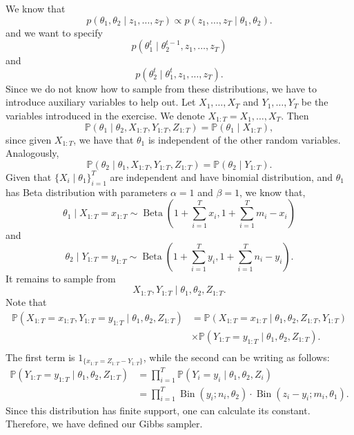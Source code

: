 \documentclass[a4paper,12pt]{article}
\newcommand{\bin}{\operatorname{Bin}}
\newcommand{\pr}{\mathbb{P}}
\theoremstyle{definition}
\begin{document}
\begin{enumerate}
    We know that 
    $$
    p( \theta_1 , \theta_2 \mid z_1 , \dots, z_T) \propto p(z_1, \dots, z_T \mid \theta_1, \theta_2).    
    $$
    and we want to specify 
    $$
    p(\theta_1^t \mid \theta_2^{t-1}, z_1, \dots, z_T) 
    $$
    and
    $$
    p(\theta_2^t \mid \theta_1^{t}, z_1, \dots, z_T).
    $$ 
    Since we do not know how to sample from these distributions, we have to
    introduce auxiliary variables to help out. Let $X_1, \dots, X_T$ and $Y_1,
    \dots, Y_T$ be the variables introduced in the exercise. We denote
    $X_{1:T} = X_1, \dots, X_T$. Then 
    $$ 
    \pr(\theta_1 \mid \theta_2, X_{1:T}, Y_{1:T}, Z_{1:T}) = \pr(\theta_1 \mid X_{1:T}),  
    $$
    since given $X_{1:T}$, we have that $\theta_1$ is independent of the other
    random variables. Analogously,  
    $$ 
    \pr(\theta_2 \mid \theta_1, X_{1:T}, Y_{1:T}, Z_{1:T}) = \pr(\theta_2 \mid Y_{1:T}).  
    $$
    Given that $\{X_i \mid \theta_1\}_{i=1}^T$ are independent and have
    binomial distribution, and $\theta_1$ has Beta distribution with
    parameters $\alpha = 1$ and $\beta = 1$, we know that, 
    $$
    \theta_1 \mid X_{1:T} = x_{1:T} \sim \operatorname{Beta}\left(1 + \sum_{i=1}^T x_i, 1 + \sum_{i=1}^T m_i - x_i\right)
    $$
    and 
    $$
    \theta_2 \mid Y_{1:T} = y_{1:T} \sim \operatorname{Beta}\left(1 + \sum_{i=1}^T y_i, 1 + \sum_{i=1}^T n_i - y_i\right).
    $$
    It remains to sample from 
    $$
    X_{1:T}, Y_{1:T} \mid \theta_1, \theta_2, Z_{1:T}.
    $$
    Note that 
    \begin{equation*}
        \begin{split}
            \pr(X_{1:T} = x_{1:T}, Y_{1:T} = y_{1:T} \mid \theta_1, \theta_2, Z_{1:T}) &= \pr(X_{1:T} = x_{1:T} \mid \theta_1, \theta_2, Z_{1:T},  Y_{1:T}) \\
            &\times \pr(Y_{1:T} = y_{1:T} \mid \theta_1, \theta_2, Z_{1:T}). \\
        \end{split}
    \end{equation*}
    The first term is $1_{\{x_{1:T} = Z_{1:T} - Y_{1:T}\}}$, while the second
    can be writing as follows: 
    \begin{equation*}
        \begin{split}
            \pr(Y_{1:T} = y_{1:T} \mid \theta_1, \theta_2, Z_{1:T}) &= \prod_{i=1}^T \pr(Y_i = y_i \mid \theta_1, \theta_2, Z_i) \\
            &= \prod_{i=1}^T \bin(y_i; n_i, \theta_2) \cdot \bin(z_i - y_i; m_i, \theta_1).
        \end{split}
    \end{equation*}
    Since this distribution has finite support, one can calculate its
    constant. Therefore, we have defined our Gibbs sampler. 
    
\end{enumerate}

% 
% 
\end{document}
